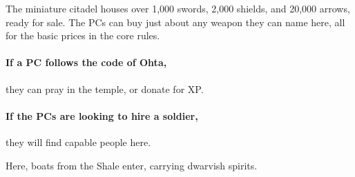 The miniature citadel houses over 1,000 swords, 2,000 shields, and 20,000 arrows, ready for sale.
The PCs can buy just about any weapon they can name here, all for the basic prices in the core rules.

\paragraph{If a PC follows the code of Ohta,}
they can pray in the temple, or donate for XP.

\paragraph{If the PCs are looking to hire a soldier,}
they will find capable people here.


Here, boats from the Shale enter, carrying dwarvish spirits.


